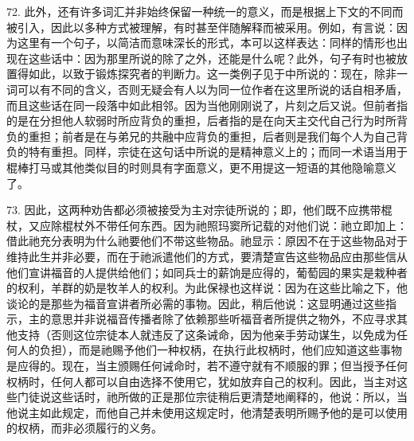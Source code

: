 72. 此外，还有许多词汇并非始终保留一种统一的意义，而是根据上下文的不同而被引入，因此以多种方式被理解，有时甚至伴随解释而被采用。例如，有言说：因为这里有一个句子，以简洁而意味深长的形式，本可以这样表达：同样的情形也出现在这些话中：因为那里所说的除了之外，还能是什么呢？此外，句子有时也被放置得如此，以致于锻炼探究者的判断力。这一类例子见于中所说的：现在，除非一词可以有不同的含义，否则无疑会有人以为同一位作者在这里所说的话自相矛盾，而且这些话在同一段落中如此相邻。因为当他刚刚说了，片刻之后又说。但前者指的是在分担他人软弱时所应背负的重担，后者指的是在向天主交代自己行为时所背负的重担；前者是在与弟兄的共融中应背负的重担，后者则是我们每个人为自己背负的特有重担。同样，宗徒在这句话中所说的是精神意义上的；而同一术语当用于棍棒打马或其他类似目的时则具有字面意义，更不用提这一短语的其他隐喻意义了。\par

73. 因此，这两种劝告都必须被接受为主对宗徒所说的；即，他们既不应携带棍杖，又应除棍杖外不带任何东西。因为祂照玛窦所记载的对他们说：祂立即加上：借此祂充分表明为什么祂要他们不带这些物品。祂显示：原因不在于这些物品对于维持此生并非必要，而在于祂派遣他们的方式，要清楚宣告这些物品应由那些信从他们宣讲福音的人提供给他们；如同兵士的薪饷是应得的，葡萄园的果实是栽种者的权利，羊群的奶是牧羊人的权利。为此保禄也这样说：因为在这些比喻之下，他谈论的是那些为福音宣讲者所必需的事物。因此，稍后他说：这显明通过这些指示，主的意思并非说福音传播者除了依赖那些听福音者所提供之物外，不应寻求其他支持（否则这位宗徒本人就违反了这条诫命，因为他亲手劳动谋生，以免成为任何人的负担），而是祂赐予他们一种权柄，在执行此权柄时，他们应知道这些事物是应得的。现在，当主颁赐任何诫命时，若不遵守就有不顺服的罪；但当授予任何权柄时，任何人都可以自由选择不使用它，犹如放弃自己的权利。因此，当主对这些门徒说这些话时，祂所做的正是那位宗徒稍后更清楚地阐释的，他说：所以，当他说主如此规定，而他自己并未使用这规定时，他清楚表明所赐予他的是可以使用的权柄，而非必须履行的义务。\par

